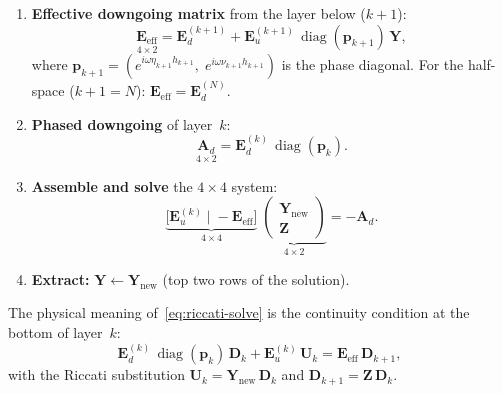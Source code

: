 \documentclass[11pt,a4paper]{article}
\theoremstyle{plain}
\theoremstyle{remark}
\begin{document}
\begin{enumerate}[nosep]
\item \textbf{Effective downgoing matrix} from the layer below ($k{+}1$):
\begin{equation}\label{eq:Eeff}
  \underset{4\times 2}{\mathbf{E}_{\text{eff}}}
  = \mathbf{E}_d^{(k+1)}
  + \mathbf{E}_u^{(k+1)}\,\operatorname{diag}(\mathbf{p}_{k+1})\,\mathbf{Y},
\end{equation}
where $\mathbf{p}_{k+1} = (e^{i\omega\eta_{k+1}h_{k+1}},\;
e^{i\omega\nu_{k+1}h_{k+1}})$ is the phase diagonal.  For the
half-space ($k{+}1 = N$): $\mathbf{E}_{\text{eff}} = \mathbf{E}_d^{(N)}$.

\item \textbf{Phased downgoing} of layer~$k$:
\begin{equation}\label{eq:Ad}
  \underset{4\times 2}{\mathbf{A}_d}
  = \mathbf{E}_d^{(k)}\,\operatorname{diag}(\mathbf{p}_k).
\end{equation}

\item \textbf{Assemble and solve} the $4\times 4$ system:
\begin{equation}\label{eq:riccati-solve}
  \boxed{
  \underbrace{\bigl[\mathbf{E}_u^{(k)} \;\big|\; {-}\mathbf{E}_{\text{eff}}\bigr]}
    _{4\times 4}
  \;\underbrace{\begin{pmatrix}\mathbf{Y}_{\text{new}} \\ \mathbf{Z}\end{pmatrix}}
    _{4\times 2}
  = -\mathbf{A}_d.
  }
\end{equation}

\item \textbf{Extract:} $\mathbf{Y} \leftarrow \mathbf{Y}_{\text{new}}$
(top two rows of the solution).
\end{enumerate}

\noindent
The physical meaning of~\eqref{eq:riccati-solve} is the continuity
condition at the bottom of layer~$k$:
\begin{equation}
  \mathbf{E}_d^{(k)}\,\operatorname{diag}(\mathbf{p}_k)\,\mathbf{D}_k
  + \mathbf{E}_u^{(k)}\,\mathbf{U}_k
  = \mathbf{E}_{\text{eff}}\,\mathbf{D}_{k+1},
\end{equation}
with the Riccati substitution $\mathbf{U}_k = \mathbf{Y}_{\text{new}}\,
\mathbf{D}_k$ and $\mathbf{D}_{k+1} = \mathbf{Z}\,\mathbf{D}_k$.
\end{document}
